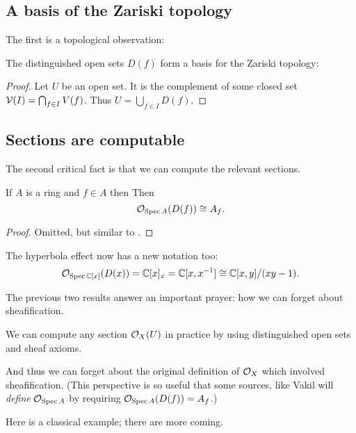 \subsection{A basis of the Zariski topology}
The first is a topological observation:
\begin{theorem}
	The distinguished open sets $D(f)$
	form a basis for the Zariski topology:
\end{theorem}
\begin{proof}
	Let $U$ be an open set.
	It is the complement of some closed set
	$\mathcal V(I) = \bigcap_{f \in I} V(f)$.
	Thus $U = \bigcup_{f \in I} D(f)$.
\end{proof}

\subsection{Sections are computable}
The second critical fact is that we can compute the relevant sections.
\begin{theorem}
	If $A$ is a ring and $f \in A$ then
	Then \[ \mathcal O_{\operatorname{Spec} A}(D(f)) \cong A_f. \]
\end{theorem}
\begin{proof}
	Omitted, but similar to
	.
\end{proof}

\begin{example}
	The hyperbola effect now has a new notation too:
	\[ \mathcal O_{\operatorname{Spec} \mathbb C[x]} (D(x))
		= \mathbb C[x]_{x} = \mathbb C[x, x^{-1}]
		\cong \mathbb C[x,y] / (xy-1). \]
\end{example}

The previous two results answer an important prayer:
how we can forget about sheafification.
\begin{moral}
	We can compute any section $\mathcal O_X(U)$ in practice
	by using distinguished open sets and sheaf axioms.
\end{moral}
And thus we can forget about the original definition of $\mathcal O_X$
which involved sheafification.
(This perspective is so useful that some sources,
like Vakil \cite[\S4.1]{ref:vakil}
will \emph{define} $\mathcal O_{\operatorname{Spec} A}$
by requiring $\mathcal O_{\operatorname{Spec} A}(D(f)) = A_f$.)

Here is a classical example; there are more coming.
\begin{example}
\end{example}

